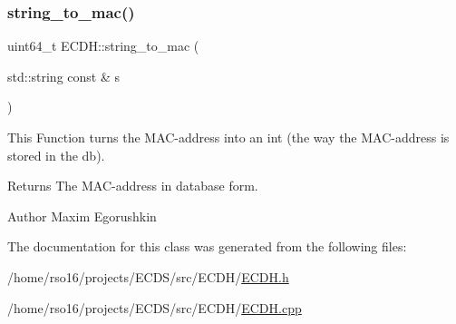 \subsubsection{\texorpdfstring{string\+\_\+to\+\_\+mac()}{string\_to\_mac()}}
{\footnotesize\ttfamily uint64\+\_\+t E\+C\+D\+H\+::string\+\_\+to\+\_\+mac (\begin{DoxyParamCaption}\item[{std\+::string const \&}]{s }\end{DoxyParamCaption})}



This Function turns the M\+A\+C-\/address into an int (the way the M\+A\+C-\/address is stored in the db). 

\begin{DoxyReturn}{Returns}
The M\+A\+C-\/address in database form. 
\end{DoxyReturn}
\begin{DoxyAuthor}{Author}
Maxim Egorushkin 
\end{DoxyAuthor}


The documentation for this class was generated from the following files\+:\begin{DoxyCompactItemize}
\item 
/home/rso16/projects/\+E\+C\+D\+S/src/\+E\+C\+D\+H/\hyperlink{ECDH_8h}{E\+C\+D\+H.\+h}\item 
/home/rso16/projects/\+E\+C\+D\+S/src/\+E\+C\+D\+H/\hyperlink{ECDH_8cpp}{E\+C\+D\+H.\+cpp}\end{DoxyCompactItemize}
